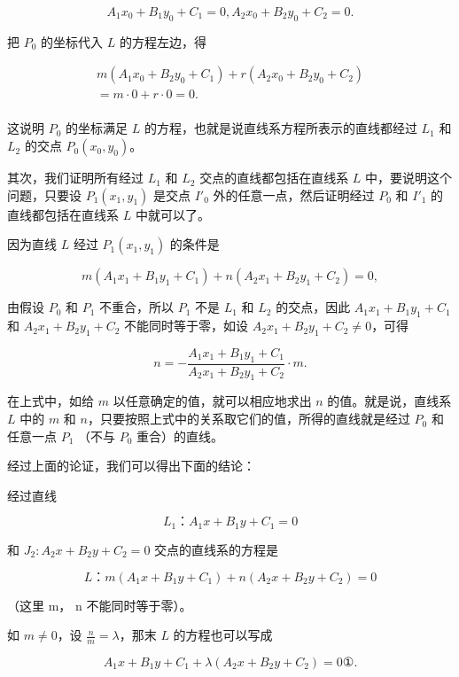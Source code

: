 \[
A_{1} x_{0} + B_{1} y_{0} + C_{1} = 0, A_{2} x_{0} + B_{2} y_{0} + C_{2} = 0.
\]

把 \(P_{0}\) 的坐标代入 \(L\) 的方程左边，得

\[
\begin{array}{l} m \left(A_{1} x_{0} + B_{2} y_{0} + C_{1}\right) + r \left(A_{2} x_{0} + B_{2} y_{0} + C_{2}\right) \\ = m \cdot 0 + r \cdot 0 = 0. \\ \end{array}
\]

这说明 \(P_{0}\) 的坐标满足 \(L\)
的方程，也就是说直线系方程所表示的直线都经过 \(L_{1}\) 和 \(L_{2}\)
的交点 \(P_{0}(x_{0}, y_{0})\)。

其次，我们证明所有经过 \(L_{1}\) 和 \(L_{2}\) 交点的直线都包括在直线系
\(L\) 中，要说明这个问题，只要设 \(P_{1}(x_{1},y_{1})\) 是交点
\(I'_{0}\) 外的任意一点，然后证明经过 \(P_{0}\) 和 \(I'_{1}\)
的直线都包括在直线系 \(L\) 中就可以了。

因为直线 \(L\) 经过 \(P_{1}(x_{1},y_{1})\) 的条件是

\[
m \left(A_{1} x_{1} + B_{1} y_{1} + C_{1}\right) + n \left(A_{2} x_{1} + B_{2} y_{1} + C_{2}\right) = 0,
\]

由假设 \(P_{0}\) 和 \(P_{1}\) 不重合，所以 \(P_{1}\) 不是 \(L_{1}\) 和
\(L_{2}\) 的交点，因此 \(A_{1}x_{1} + B_{1}y_{1} + C_{1}\) 和
\(A_{2}x_{1} + B_{2}y_{1} + C_{2}\) 不能同时等于零，如设
\(A_{2}x_{1} + B_{2}y_{1} + C_{2} \neq 0\)，可得

\[
n = - \frac {A_{1} x_{1} + B_{1} y_{1} + C_{1}}{A_{2} x_{1} + B_{2} y_{1} + C_{2}} \cdot m.
\]

在上式中，如给 \(m\) 以任意确定的值，就可以相应地求出 \(n\)
的值。就是说，直线系 \(L\) 中的 \(m\) 和
\(n\)，只要按照上式中的关系取它们的值，所得的直线就是经过 \(P_0\)
和任意一点 \(P_1\) （不与 \(P_0\) 重合）的直线。

经过上面的论证，我们可以得出下面的结论：

经过直线

\[
L_{1}\text{：} A_{1} x + B_{1} y + C_{1} = 0
\]

和 \(J_{2}: A_{2}x + B_{2}y + C_{2} = 0\) 交点的直线系的方程是

\[
L\text{：} m (A_{1} x + B_{1} y + C_{1}) + n (A_{2} x + B_{2} y + C_{2}) = 0
\]

（这里 m， n 不能同时等于零）。

如 \(m \neq 0\)，设 \(\frac{n}{m} = \lambda\)，那末 \(L\)
的方程也可以写成

\[
A_{1} x + B_{1} y + C_{1} + \lambda (A_{2} x + B_{2} y + C_{2}) = 0 ①.
\]

